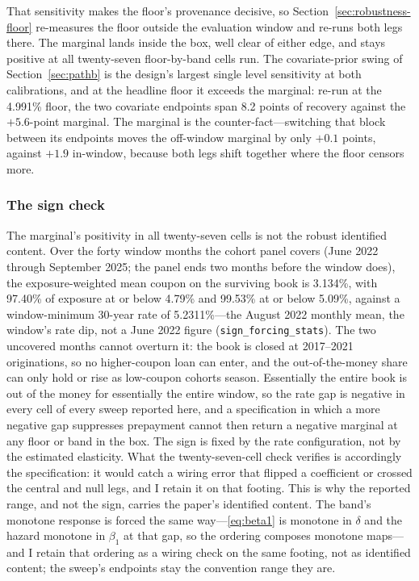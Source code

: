 That sensitivity makes the floor's provenance decisive, so Section~\ref{sec:robustness-floor} re-measures the floor outside the evaluation window and re-runs both legs there. The marginal lands inside the box, well clear of either edge, and stays positive at all twenty-seven floor-by-band cells run. The covariate-prior swing of Section~\ref{sec:pathb} is the design's largest single level sensitivity at both calibrations, and at the headline floor it exceeds the marginal: re-run at the 4.991\% floor, the two covariate endpoints span 8.2 points of recovery against the $+5.6$-point marginal. The marginal is the counter-fact---switching that block between its endpoints moves the off-window marginal by only $+0.1$ points, against $+1.9$ in-window, because both legs shift together where the floor censors more.

\subsubsection{The sign check}

The marginal's positivity in all twenty-seven cells is not the robust identified content. Over the forty window months the cohort panel covers (June 2022 through September 2025; the panel ends two months before the window does), the exposure-weighted mean coupon on the surviving book is 3.134\%, with 97.40\% of exposure at or below 4.79\% and 99.53\% at or below 5.09\%, against a window-minimum 30-year rate of 5.2311\%---the August 2022 monthly mean, the window's rate dip, not a June 2022 figure (\texttt{sign\_forcing\_stats}). The two uncovered months cannot overturn it: the book is closed at 2017--2021 originations, so no higher-coupon loan can enter, and the out-of-the-money share can only hold or rise as low-coupon cohorts season. Essentially the entire book is out of the money for essentially the entire window, so the rate gap is negative in every cell of every sweep reported here, and a specification in which a more negative gap suppresses prepayment cannot then return a negative marginal at any floor or band in the box. The sign is fixed by the rate configuration, not by the estimated elasticity. What the twenty-seven-cell check verifies is accordingly the specification: it would catch a wiring error that flipped a coefficient or crossed the central and null legs, and I retain it on that footing. This is why the reported range, and not the sign, carries the paper's identified content. The band's monotone response is forced the same way---\eqref{eq:beta1} is monotone in $\delta$ and the hazard monotone in $\beta_1$ at that gap, so the ordering composes monotone maps---and I retain that ordering as a wiring check on the same footing, not as identified content; the sweep's endpoints stay the convention range they are.

